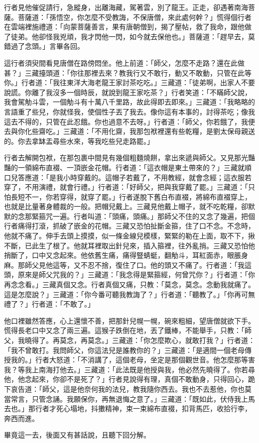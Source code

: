 行者見他催促請行，急縱身，出離海藏，駕著雲，別了龍王。正走，卻遇著南海菩薩。菩薩道：「孫悟空，你怎麼不受教誨，不保唐僧，來此處何幹？」慌得個行者在雲端裡施禮道：「向蒙菩薩善言，果有唐朝僧到，揭了壓帖，救了我命，跟他做了徒弟。他卻怪我兇頑，我才閃他一閃，如今就去保他也。」菩薩道：「趕早去，莫錯過了念頭。」言畢各回。

這行者須臾間看見唐僧在路傍悶坐。他上前道：「師父，怎麼不走路？還在此做甚？」三藏擡頭道：「你往那裡去來？教我行又不敢行，動又不敢動，只管在此等你。」行者道：「我往東洋大海老龍王家討茶吃吃。」三藏道：「徒弟啊，出家人不要說謊。你離了我沒多一個時辰，就說到龍王家吃茶？」行者笑道：「不瞞師父說，我會駕觔斗雲，一個觔斗有十萬八千里路，故此得即去即來。」三藏道：「我略略的言語重了些兒，你就怪我，使個性子丟了我去。像你這有本事的，討得茶吃；像我這去不得的，只管在此忍餓。你也過意不去呀。」行者道：「師父，你若餓了，我便去與你化些齋吃。」三藏道：「不用化齋，我那包袱裡還有些乾糧，是劉太保母親送的。你去拿缽盂尋些水來，等我吃些兒走路罷。」

行者去解開包袱，在那包裹中間見有幾個粗麵燒餅，拿出來遞與師父。又見那光豔豔的一領綿布直裰、一頂嵌金花帽。行者道：「這衣帽是東土帶來的？」三藏就順口兒答應道：「是我小時穿戴的。這帽子若戴了，不用教經，就會念經；這衣服若穿了，不用演禮，就會行禮。」行者道：「好師父，把與我穿戴了罷。」三藏道：「只怕長短不一，你若穿得，就穿了罷。」行者遂脫下舊白布直裰，將綿布直裰穿上，也就是比量著身體裁的一般。把帽兒戴上。三藏見他戴上帽子，就不吃乾糧，卻默默的念那緊箍咒一遍。行者叫道：「頭痛，頭痛。」那師父不住的又念了幾遍，把個行者痛得打滾，抓破了嵌金的花帽。三藏又恐怕扯斷金箍，住了口不念。不念時，他就不痛了。伸手去頭上摸摸，似一條金線兒模樣，緊緊的勒在上面，取不下，揪不斷，已此生了根了。他就耳裡取出針兒來，插入箍裡，往外亂捎。三藏又恐怕他捎斷了，口中又念起來。他依舊生痛，痛得豎蜻蜓，翻觔斗，耳紅面赤，眼脹身麻。那師父見他這等，又不忍不捨，復住了口。他的頭又不痛了。行者道：「我這頭，原來是師父咒我的？」三藏道：「我念得是緊箍經，何曾咒你？」行者道：「你再念念看。」三藏真個又念。行者真個又痛，只教：「莫念，莫念。念動我就痛了。這是怎麼說？」三藏道：「你今番可聽我教誨了？」行者道：「聽教了。」「你再可無禮了？」行者道：「不敢了。」

他口裡雖然答應，心上還懷不善，把那針兒幌一幌，碗來粗細，望唐僧就欲下手。慌得長老口中又念了兩三遍。這猴子跌倒在地，丟了鐵棒，不能舉手，只教：「師父，我曉得了。再莫念，再莫念。」三藏道：「你怎麼欺心，就敢打我？」行者道：「我不曾敢打。我問師父，你這法兒是誰教你的？」三藏道：「是適間一個老母傳授我的。」行者大怒道：「不消講了，這個老母，坐定是那個觀世音。他怎麼那等害我？等我上南海打他去。」三藏道：「此法既是他授與我，他必然先曉得了。你若尋他，他念起來，你卻不是死了？」行者見說得有理，真個不敢動身，只得回心，跪下哀告道：「師父，這是他奈何我的法兒，教我隨你西去。我也不去惹他，你也莫當常言，只管念誦。我願保你，再無退悔之意了。」三藏道：「既如此，伏侍我上馬去也。」那行者才死心塌地，抖擻精神，束一束綿布直裰，扣背馬匹，收拾行李，奔西而進。

畢竟這一去，後面又有甚話說，且聽下回分解。
